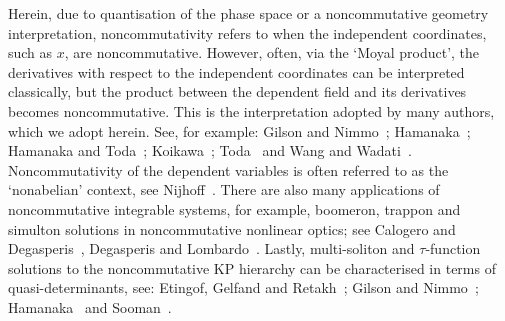 \documentclass[5p,twocolumn]{elsarticle}
\begin{document}
Herein, due to quantisation of the phase space or a noncommutative geometry interpretation, noncommutativity refers to when the independent coordinates, such as $x$, are noncommutative.
However, often, via the `Moyal product', the derivatives with respect to the independent coordinates can be interpreted classically, but the product
between the dependent field and its derivatives becomes noncommutative.
This is the interpretation adopted by many authors, which we adopt herein. 
See, for example: Gilson and Nimmo~\cite{GN}; Hamanaka~\cite{Hamanaka}; Hamanaka and Toda~\cite{HamanakaToda}; Koikawa~\cite{Koikawa}; Toda~\cite{Toda} and Wang and Wadati~\cite{WW}.
Noncommutativity of the dependent variables is often referred to as the `nonabelian' context, see Nijhoff~\cite{Nijhoff-Lagrangian3form}.
There are also many applications of noncommutative integrable systems, for example, boomeron, trappon and simulton solutions in noncommutative nonlinear optics;
see Calogero and Degasperis~\cite{CD}, Degasperis and Lombardo~\cite{DL}. 
Lastly, multi-soliton and $\tau$-function solutions to the noncommutative KP hierarchy can be characterised in terms of quasi-determinants,
see: Etingof, Gelfand and Retakh~\cite{EGR97,EGR98}; Gilson and Nimmo~\cite{GN}; Hamanaka~\cite{Hamanaka} and Sooman~\cite{So}.
\end{document}
